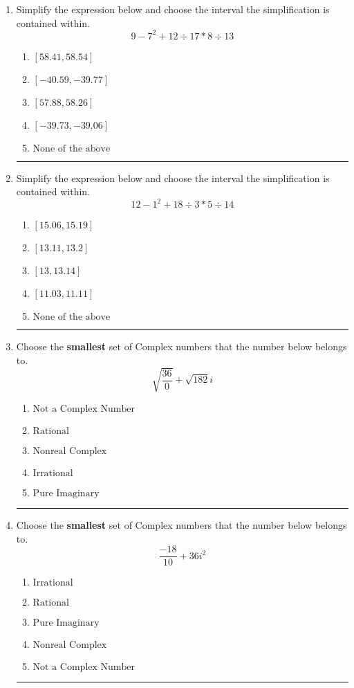 \documentclass[14pt]{extbook}
\newcommand{\litem}[1]{\item#1\hspace*{-1cm}\rule{\textwidth}{0.4pt}}
\begin{document}
\begin{enumerate}
{\begin{enumerate}[label=\Alph*.]
\end{enumerate} }
\litem{
Simplify the expression below and choose the interval the simplification is contained within.\[ 9 - 7^2 + 12 \div 17 * 8 \div 13 \]\begin{enumerate}[label=\Alph*.]
\item \( [58.41, 58.54] \)
\item \( [-40.59, -39.77] \)
\item \( [57.88, 58.26] \)
\item \( [-39.73, -39.06] \)
\item \( \text{None of the above} \)

\end{enumerate} }
\litem{
Simplify the expression below and choose the interval the simplification is contained within.\[ 12 - 1^2 + 18 \div 3 * 5 \div 14 \]\begin{enumerate}[label=\Alph*.]
\item \( [15.06, 15.19] \)
\item \( [13.11, 13.2] \)
\item \( [13, 13.14] \)
\item \( [11.03, 11.11] \)
\item \( \text{None of the above} \)

\end{enumerate} }
\litem{
Choose the \textbf{smallest} set of Complex numbers that the number below belongs to.\[ \sqrt{\frac{36}{0}}+\sqrt{182} i \]\begin{enumerate}[label=\Alph*.]
\item \( \text{Not a Complex Number} \)
\item \( \text{Rational} \)
\item \( \text{Nonreal Complex} \)
\item \( \text{Irrational} \)
\item \( \text{Pure Imaginary} \)

\end{enumerate} }
\litem{
Choose the \textbf{smallest} set of Complex numbers that the number below belongs to.\[ \frac{-18}{10}+36i^2 \]\begin{enumerate}[label=\Alph*.]
\item \( \text{Irrational} \)
\item \( \text{Rational} \)
\item \( \text{Pure Imaginary} \)
\item \( \text{Nonreal Complex} \)
\item \( \text{Not a Complex Number} \)


\end{enumerate}}
\end{enumerate}
\end{document}
